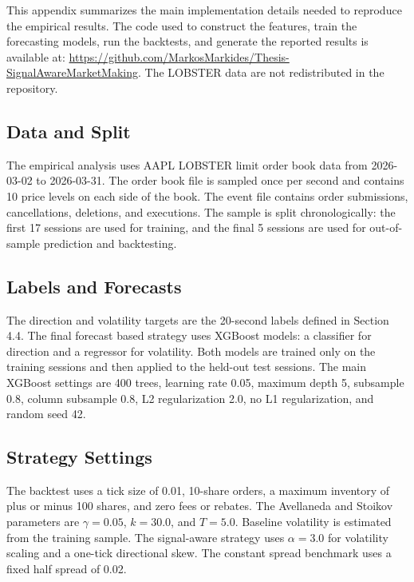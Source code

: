 \documentclass[12pt,a4paper]{article}
\begin{document}
\begingroup
{}
\setlength{\parskip}{0.45em}

This appendix summarizes the main implementation details needed to
reproduce the empirical results. The code used to construct the features,
train the forecasting models, run the backtests, and generate the
reported results is available at:
\url{https://github.com/MarkosMarkides/Thesis-SignalAwareMarketMaking}.
The LOBSTER data are not redistributed in the repository.

\subsection{Data and Split}\label{data-and-split}

The empirical analysis uses AAPL LOBSTER limit order book data from
2026-03-02 to 2026-03-31. The order book file is sampled once per second
and contains 10 price levels on each side of the book. The event file
contains order submissions, cancellations, deletions, and executions. The
sample is split chronologically: the first 17 sessions are used for
training, and the final 5 sessions are used for out-of-sample prediction
and backtesting.

\subsection{Labels and Forecasts}\label{labels-and-forecasts}

The direction and volatility targets are the 20-second labels defined in
Section 4.4. The final forecast based strategy uses XGBoost models: a
classifier for direction and a regressor for volatility. Both models are
trained only on the training sessions and then applied to the held-out
test sessions. The main XGBoost settings are 400 trees, learning rate
0.05, maximum depth 5, subsample 0.8, column subsample 0.8, L2
regularization 2.0, no L1 regularization, and random seed 42.

\subsection{Strategy Settings}\label{strategy-settings}

The backtest uses a tick size of 0.01, 10-share orders, a maximum
inventory of plus or minus 100 shares, and zero fees or rebates. The
Avellaneda and Stoikov parameters are \(\gamma=0.05\), \(k=30.0\), and
\(T=5.0\). Baseline volatility is estimated from the training sample. The
signal-aware strategy uses \(\alpha=3.0\) for volatility scaling and a
one-tick directional skew. The constant spread benchmark uses a fixed
half spread of 0.02.
\end{document}
